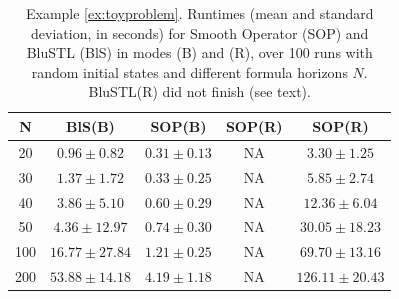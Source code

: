 \begin{table}[tb]
\small
\begin{center}
\caption{{\small Example \ref{ex:toyproblem}. Runtimes (mean and standard deviation, in seconds) for Smooth Operator (SOP) and BluSTL (BlS) in modes (B) and (R), over 100 runs with random initial states and different formula horizons $N$. BluSTL(R) did not finish (see text).}}
\vspace{-5pt}
\label{tbl:time_performance_toy}
\begin{tabular} {|c|c|c|c|c|}
	\hline
	N & BlS(B) & SOP(B) & SOP(R) & SOP(R) \\ \hline
	20 & $0.96 \pm 0.82$ &  $\mathbf{0.31 \pm 0.13}$  & NA & $3.30 \pm 1.25$ \\ \hline
	30 & $1.37 \pm 1.72$ &  $\mathbf{0.33 \pm 0.25}$  & NA & $5.85 \pm 2.74$\\ \hline
	40 & $3.86 \pm 5.10$ &  $\mathbf{0.60 \pm 0.29}$  & NA & $12.36 \pm 6.04$\\ \hline
	50 & $4.36 \pm 12.97$&  $\mathbf{0.74 \pm 0.30}$ & NA & $30.05 \pm 18.23$\\ \hline
	100& $16.77 \pm 27.84$ & $\mathbf{1.21 \pm 0.25}$ & NA & $69.70 \pm 13.16$ \\ \hline
	200& $53.88 \pm 14.18$& $\mathbf{4.19 \pm 1.18}$ & NA & $126.11 \pm 20.43$ \\ \hline
\end{tabular}	
\end{center}
\end{table}


